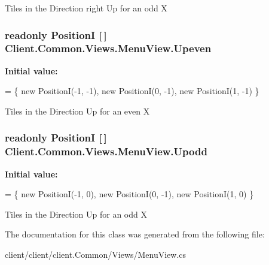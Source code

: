 Tiles in the Direction right Up for an odd X 

\hypertarget{classClient_1_1Common_1_1Views_1_1MenuView_ad5d3faf457e317d3c0757a13ff310e0c}{}
\subsubsection[{Upeven}]{\setlength{\rightskip}{0pt plus 5cm}readonly {\bf Position\+I} \mbox{[}$\,$\mbox{]} Client.\+Common.\+Views.\+Menu\+View.\+Upeven\hspace{0.3cm}{\ttfamily [static]}}\label{classClient_1_1Common_1_1Views_1_1MenuView_ad5d3faf457e317d3c0757a13ff310e0c}
{\bfseries Initial value\+:}
\begin{DoxyCode}
=
            \{
                \textcolor{keyword}{new} PositionI(-1, -1),
                \textcolor{keyword}{new} PositionI(0, -1),
                \textcolor{keyword}{new} PositionI(1, -1)
            \}
\end{DoxyCode}


Tiles in the Direction Up for an even X 

\hypertarget{classClient_1_1Common_1_1Views_1_1MenuView_abb38bb872b2393e613c4e9f20498a0b2}{}
\subsubsection[{Upodd}]{\setlength{\rightskip}{0pt plus 5cm}readonly {\bf Position\+I} \mbox{[}$\,$\mbox{]} Client.\+Common.\+Views.\+Menu\+View.\+Upodd\hspace{0.3cm}{\ttfamily [static]}}\label{classClient_1_1Common_1_1Views_1_1MenuView_abb38bb872b2393e613c4e9f20498a0b2}
{\bfseries Initial value\+:}
\begin{DoxyCode}
=
            \{
                \textcolor{keyword}{new} PositionI(-1, 0),
                \textcolor{keyword}{new} PositionI(0, -1),
                \textcolor{keyword}{new} PositionI(1, 0)
            \}
\end{DoxyCode}


Tiles in the Direction Up for an odd X 



The documentation for this class was generated from the following file\+:\begin{DoxyCompactItemize}
\item 
client/client/client.\+Common/\+Views/Menu\+View.\+cs\end{DoxyCompactItemize}
